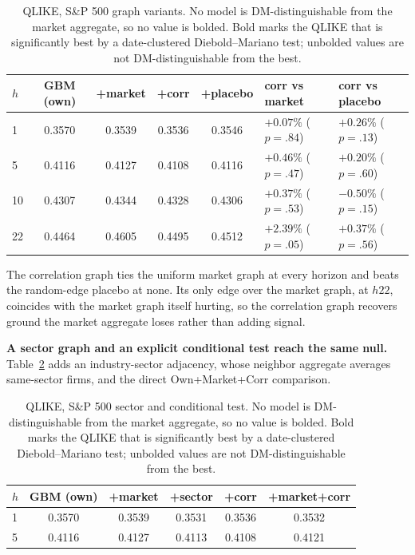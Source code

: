 \documentclass{llncs}
\begin{document}
\begin{table}[t]
\centering
\caption{QLIKE, S\&P 500 graph variants. No model is DM-distinguishable from the market aggregate, so no value is
bolded. Bold marks the QLIKE that is significantly best by a date-clustered Diebold--Mariano test; unbolded values
are not DM-distinguishable from the best.}
\label{tab:sp-graph}
\footnotesize
\setlength{\tabcolsep}{6pt}
\begin{tabular}{lccccll}
\toprule
$h$ & GBM (own) & +market & +corr & +placebo & corr vs market & corr vs placebo \\
\midrule
1  & 0.3570 & 0.3539 & 0.3536 & 0.3546 & $+0.07\%$ ($p{=}.84$) & $+0.26\%$ ($p{=}.13$) \\
5  & 0.4116 & 0.4127 & 0.4108 & 0.4116 & $+0.46\%$ ($p{=}.47$) & $+0.20\%$ ($p{=}.60$) \\
10 & 0.4307 & 0.4344 & 0.4328 & 0.4306 & $+0.37\%$ ($p{=}.53$) & $-0.50\%$ ($p{=}.15$) \\
22 & 0.4464 & 0.4605 & 0.4495 & 0.4512 & $+2.39\%$ ($p{=}.05$) & $+0.37\%$ ($p{=}.56$) \\
\bottomrule
\end{tabular}
\end{table}

The correlation graph ties the uniform market graph at every horizon and beats the random-edge placebo at none.
Its only edge over the market graph, at $h22$, coincides with the market graph itself hurting, so the correlation
graph recovers ground the market aggregate loses rather than adding signal.

\textbf{A sector graph and an explicit conditional test reach the same null.} Table~\ref{tab:sp-sector} adds an industry-sector
adjacency, whose neighbor aggregate averages same-sector firms, and the direct Own+Market+Corr comparison.

\begin{table}[t]
\centering
\caption{QLIKE, S\&P 500 sector and conditional test. No model is DM-distinguishable from the market aggregate, so
no value is bolded. Bold marks the QLIKE that is significantly best by a date-clustered Diebold--Mariano test;
unbolded values are not DM-distinguishable from the best.}
\label{tab:sp-sector}
\footnotesize
\setlength{\tabcolsep}{8pt}
\begin{tabular}{lccccc}
\toprule
$h$ & GBM (own) & +market & +sector & +corr & +market+corr \\
\midrule
1 & 0.3570 & 0.3539 & 0.3531 & 0.3536 & 0.3532 \\
5 & 0.4116 & 0.4127 & 0.4113 & 0.4108 & 0.4121 \\
\bottomrule
\end{tabular}
\end{table}
\end{document}
